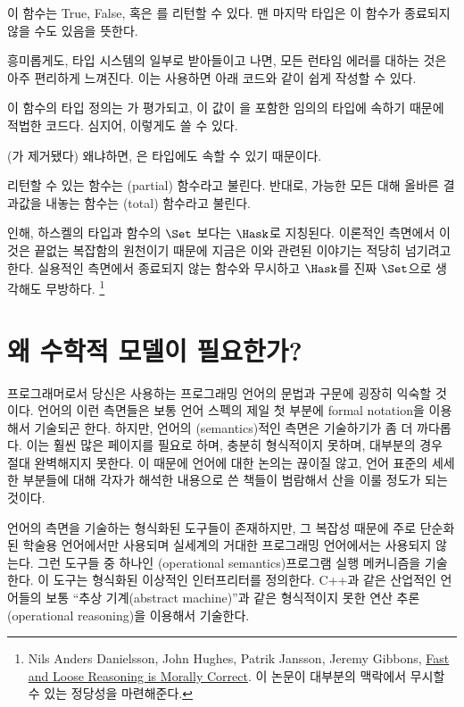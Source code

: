 이 함수는 True, False, 혹은 \code{\_|\_}를 리턴할 수 있다. 맨 마지막 타입은 이 함수가 종료되지 않을 수도 있음을 뜻한다.

흥미롭게도, \trBottom\을 타입 시스템의 일부로 받아들이고 나면, 모든 런타임 에러를 \trBottom{} 대하는 것은 아주 편리하게 느껴진다. 이는  \trExpression\을 사용하면 아래 코드와 같이 쉽게 작성할 수 있다.


이 함수의 타입 정의는 가 \trBottom{} 평가되고, 이 값이 을 포함한 임의의 타입에 속하기 때문에 적법한 코드다. 심지어, 이렇게도 쓸 수 있다.


(가 제거됐다) 왜냐하면, \trBottom 은  타입에도 속할 수 있기 때문이다.

\trBottom\을 리턴할 수 있는 함수는 \trPartial(partial) 함수라고 불린다. 반대로, 가능한 모든  대해 올바른 결과값을 내놓는 함수는 \trTotal(total) 함수라고 불린다.

\trBottom{} 인해, 하스켈의 타입과 함수의 \trCategory\는 $\Set$ 보다는 $\Hask$로 지칭된다.
이론적인 측면에서 이것은 끝없는 복잡함의 원천이기 때문에 지금은 이와 관련된 이야기는 적당히 넘기려고 한다. 실용적인 측면에서 종료되지 않는 함수와 \trBottom\을 무시하고 $\Hask$를 진짜 $\Set$으로 생각해도 무방하다.
\footnote{Nils Anders Danielsson,
John Hughes, Patrik Jansson, Jeremy Gibbons, \href{http://www.cs.ox.ac.uk/jeremy.gibbons/publications/fast+loose.pdf}{
Fast and Loose Reasoning is Morally Correct}. 이 논문이 대부분의 맥락에서 \trBottom\을 무시할 수 있는 정당성을 마련해준다.}

\section{왜 수학적 모델이 필요한가?}

프로그래머로서 당신은 사용하는 프로그래밍 언어의 문법과 구문에 굉장히 익숙할 것이다.
언어의 이런 측면들은 보통 언어 스펙의 제일 첫 부분에 formal notation을 이용해서 기술되곤 한다. %
하지만, 언어의 \trSemantics(semantics)적인 측면은 기술하기가 좀 더 까다롭다. 이는 훨씬 많은 페이지를 필요로 하며, 충분히 형식적이지 못하며, 대부분의 경우 절대 완벽해지지 못한다.
이 때문에 언어에 대한 논의는 끊이질 않고, 언어 표준의 세세한 부분들에 대해 각자가 해석한 내용으로 쓴 책들이 범람해서 산을 이룰 정도가 되는 것이다.

언어의  측면을 기술하는 형식화된 도구들이 존재하지만, 그 복잡성 때문에 주로 단순화된 학술용 언어에서만 사용되며 실세계의 거대한 프로그래밍 언어에서는 사용되지 않는다.
그런 도구들 중 하나인 \newterm{\trOperationalSemantics}(operational semantics)\는 프로그램 실행 메커니즘을 기술한다. 이 도구는 형식화된 이상적인 인터프리터를 정의한다.
C++과 같은 산업적인 언어들의 \trSemantics\는 보통 ``추상 기계(abstract machine)''과 같은 형식적이지 못한 연산 추론(operational reasoning)을 이용해서 기술한다.

